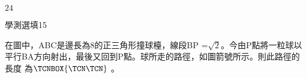 \begin{QUESTIONS}
\begin{QUESTION}
\begin{QBODY}
        \end{QBODY}
        \begin{QFROMS}
        \end{QFROMS}
        \begin{QTAGS}\end{QTAGS}
        \begin{QANS}
            $24$
        \end{QANS}
        \begin{QSOLLIST}
        \end{QSOLLIST}
        \begin{QEMPTYSPACE}
        \end{QEMPTYSPACE}
    \end{QUESTION}
    \begin{QUESTION}
        \begin{ExamInfo}{87}{學測}{選填}{15}
        \end{ExamInfo}
        \begin{ExamAnsRateInfo}{}{}{}{}
        \end{ExamAnsRateInfo}
        \begin{QBODY}
            在圖中，ABC是邊長為8的正三角形撞球檯，線段BP =$\sqrt{2}$。今由P點將一粒球以平行BA方向射出，最後又回到P點。球所走的路徑，如圖箭號所示。則此路徑的長度
            為$\TCNBOX{\TCN\TCN}$             。
            

\end{QBODY}
\end{QUESTION}
\end{QUESTIONS}
